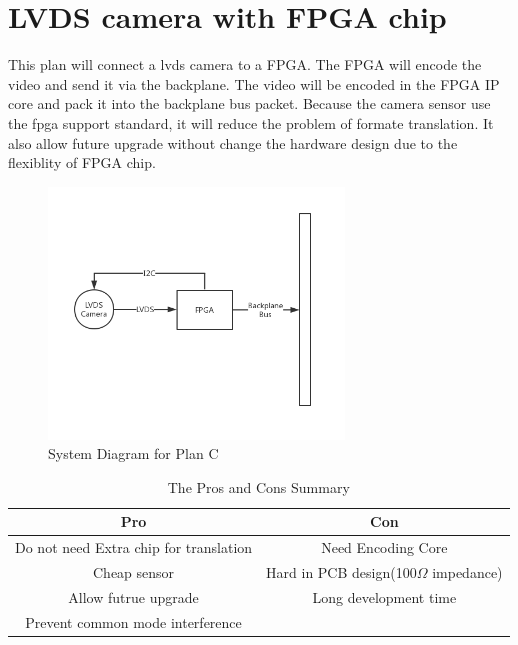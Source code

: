 \documentclass[12pt,article]{memoir}
\begin{document}
\section{LVDS camera with FPGA chip}
This plan will connect a lvds camera to a FPGA. The FPGA will encode the video and send it via the backplane. The video will be encoded in the FPGA IP core and pack it into the backplane bus packet. Because the camera sensor use the fpga support standard, it will reduce the problem of formate translation. It also allow future upgrade without change the hardware design due to the flexiblity of FPGA chip.
\begin{figure}[htp]
\begin{center}
\includegraphics[width=0.7\textwidth]{DR00002_Plan3.png}
 \caption{System Diagram for Plan C}	
\end{center}
\end{figure}
\begin{table}[H]
	\centering
		\begin{tabu}{c | c }
		Pro & Con \\ \hline
		Do not need Extra chip for translation & Need Encoding Core \\
		Cheap sensor & Hard in PCB design(100$\Omega$ impedance) \\
		Allow futrue upgrade & Long development time \\
		Prevent common mode interference  &  \\
		\end{tabu}
	\caption{The Pros and Cons Summary}
\end{table}
\newpage
\end{document}
